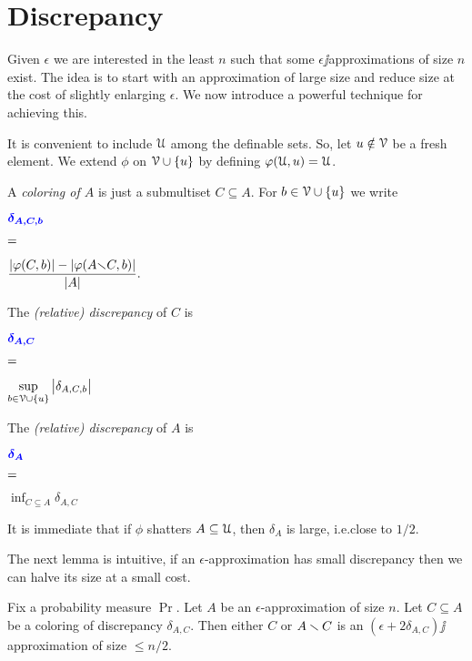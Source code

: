 \documentclass[sputnik.tex]{subfiles}
\begin{document}
\section{Discrepancy}\label{epsilon_approximations}

\def\ceq#1#2#3{\parbox[t]{30ex}{$\displaystyle #1$}\parbox{5ex}{$\displaystyle\hfil #2$}{$\displaystyle #3$}}

Given $\epsilon$ we are interested in the least $n$ such that some $\epsilon\jj$approximations of size $n$ exist.
The idea is to start with an approximation of large size and reduce size at the cost of slightly enlarging $\epsilon$.
We now introduce a powerful technique for achieving this.

It is convenient to include $\EuScript U$ among the definable sets. So, let $u\notin\EuScript V$ be a fresh element. We extend $\phi$ on $\EuScript V\cup\{u\}$ by defining \emph{$\varphi(\EuScript U,u)=\EuScript U$}. 

A \emph{coloring of $A$\/} is just a submultiset $C\subseteq A$.
For $b\in\EuScript V\cup\{u\}$ we write 

\ceq{\hfill\emph{$\delta_{A,C,b}$}}{=}{\frac{|\phi(C,b)|-|\phi(A{\sm} C,b)|}{|A|}.}

The \emph{(relative) discrepancy\/} of $C$ is\smallskip

\ceq{\hfill\emph{$\delta_{A,C}$}}{=}{\sup_{b\in\V\cup\{u\}}\big|\delta_{A,C,b}\big|}

The \emph{(relative) discrepancy\/} of $A$ is 

\ceq{\hfill \emph{$\delta_A$}}{=}{\inf_{C\subseteq A}\delta_{A,C}}

\smallskip
It is immediate that if $\phi$ shatters $A\subseteq\EuScript U$, then $\delta_A$ is large, i.e.\@ close to $1/2$.

The next lemma is intuitive, if an $\epsilon$-approximation has small discrepancy then we can halve its size at a small cost.

\begin{lemma}\label{lem_aprossimazionediapprossimazione}
Fix a probability measure\/ $\Pr$. Let $A$ be an $\epsilon$-approximation of size $n$.
Let $C\subseteq A$ be a coloring of discrepancy $\delta_{A,C}$.
Then either $C$ or $A\smallsetminus C$ is an $(\epsilon+2\delta_{A,C})\jj$approximation of size $\le n/2$.
\end{lemma}
\end{document}
